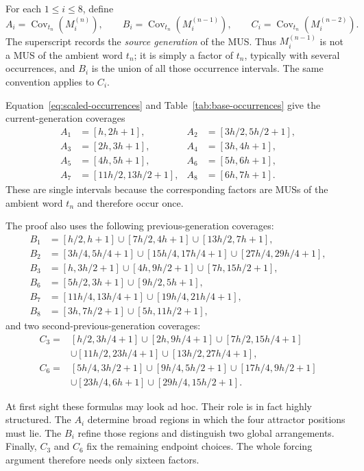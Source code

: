 \documentclass[11pt,a4paper]{article}
\theoremstyle{definition}\newtheorem{definition}[theorem]{Definition}
\theoremstyle{remark}\newtheorem{remark}[theorem]{Remark}
\newcommand{\Cov}{\operatorname{Cov}}
\begin{document}
For each $1\le i\le8$, define
\[
 A_i=\Cov_{t_n}(M_i^{(n)}),\qquad
 B_i=\Cov_{t_n}(M_i^{(n-1)}),\qquad
 C_i=\Cov_{t_n}(M_i^{(n-2)}).
\]
The superscript records the \emph{source generation} of the MUS.  Thus $M_i^{(n-1)}$ is not a MUS of the ambient word $t_n$; it is simply a factor of $t_n$, typically with several occurrences, and $B_i$ is the union of all those occurrence intervals.  The same convention applies to $C_i$.

Equation~\eqref{eq:scaled-occurrences} and Table~\ref{tab:base-occurrences} give the current-generation coverages
\begin{align*}
A_1&=[h,2h+1], & A_2&=[3h/2,5h/2+1],\\
A_3&=[2h,3h+1], & A_4&=[3h,4h+1],\\
A_5&=[4h,5h+1], & A_6&=[5h,6h+1],\\
A_7&=[11h/2,13h/2+1], & A_8&=[6h,7h+1].
\end{align*}
These are single intervals because the corresponding factors are MUSs of the ambient word $t_n$ and therefore occur once.

The proof also uses the following previous-generation coverages:
\begin{align*}
B_1&=[h/2,h+1]\cup[7h/2,4h+1]\cup[13h/2,7h+1],\\
B_2&=[3h/4,5h/4+1]\cup[15h/4,17h/4+1]\cup[27h/4,29h/4+1],\\
B_3&=[h,3h/2+1]\cup[4h,9h/2+1]\cup[7h,15h/2+1],\\
B_6&=[5h/2,3h+1]\cup[9h/2,5h+1],\\
B_7&=[11h/4,13h/4+1]\cup[19h/4,21h/4+1],\\
B_8&=[3h,7h/2+1]\cup[5h,11h/2+1],
\end{align*}
and two second-previous-generation coverages:
\begin{align*}
C_3={}&[h/2,3h/4+1]\cup[2h,9h/4+1]\cup[7h/2,15h/4+1]\\
&\cup[11h/2,23h/4+1]\cup[13h/2,27h/4+1],\\
C_6={}&[5h/4,3h/2+1]\cup[9h/4,5h/2+1]\cup[17h/4,9h/2+1]\\
&\cup[23h/4,6h+1]\cup[29h/4,15h/2+1].
\end{align*}

At first sight these formulas may look ad hoc.  Their role is in fact highly structured.  The $A_i$ determine broad regions in which the four attractor positions must lie.  The $B_i$ refine those regions and distinguish two global arrangements.  Finally, $C_3$ and $C_6$ fix the remaining endpoint choices.  The whole forcing argument therefore needs only sixteen factors.
\end{document}

